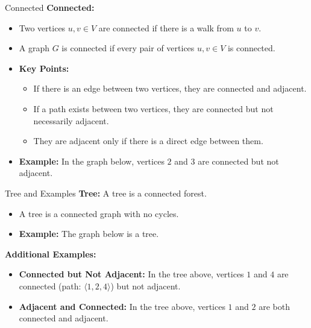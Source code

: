 \documentclass{beamer}
\begin{document}
\begin{frame}{Connected}
    \textbf{Connected:}
    \begin{itemize}
        \item Two vertices $u, v \in V$ are connected if there is a walk from $u$ to $v$.
        \item A graph $G$ is connected if every pair of vertices $u, v \in V$ is connected.
        \item \textbf{Key Points:}
            \begin{itemize}
                \item If there is an edge between two vertices, they are connected and adjacent.
                \item If a path exists between two vertices, they are connected but not necessarily adjacent.
                \item They are adjacent only if there is a direct edge between them.
            \end{itemize}
        \item \textbf{Example:} In the graph below, vertices $2$ and $3$ are connected but not adjacent.
    \end{itemize}

    \centering
\end{frame}


\begin{frame}{Tree and Examples}
    \textbf{Tree:} A tree is a connected forest.
    \begin{itemize}
        \item A tree is a connected graph with no cycles.
        \item \textbf{Example:} The graph below is a tree.
    \end{itemize}

    \centering

    \textbf{Additional Examples:}
    \begin{itemize}
        \item \textbf{Connected but Not Adjacent:} In the tree above, vertices $1$ and $4$ are connected (path: $\langle 1, 2, 4 \rangle$) but not adjacent.
        \item \textbf{Adjacent and Connected:} In the tree above, vertices $1$ and $2$ are both connected and adjacent.
    \end{itemize}
\end{frame}
\end{document}
